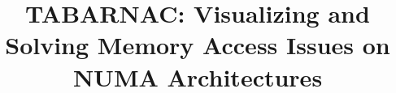 \documentclass{sty/acm_proc_article-sp}
\begin{document}
\title{TABARNAC: Visualizing and Solving Memory Access Issues on NUMA Architectures}

%
%
%
%
\end{document}
